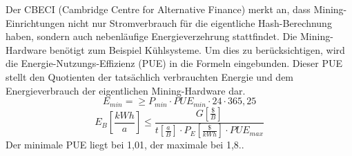 Der CBECI (Cambridge Centre for Alternative Finance) merkt an, dass Mining-Einrichtungen nicht nur Stromverbrauch für die eigentliche Hash-Berechnung haben, sondern auch nebenläufige Energieverzehrung stattfindet. Die Mining-Hardware benötigt zum Beispiel Kühlsysteme. Um dies zu berücksichtigen, wird die Energie-Nutzungs-Effizienz (PUE) in die Formeln eingebunden. Dieser PUE stellt den Quotienten der tatsächlich verbrauchten Energie und dem Energieverbrauch der eigentlichen Mining-Hardware dar.
\[E_{min}=\geq P_{min}\cdot PUE_{min}\cdot 24\cdot 365,25\]
\[E_B\left[\frac{kWh}{a}\right]\leq\frac{G\left[\frac{\$}{B}\right]}{t \left[\frac{a}{B}\right]\cdot P_E\left[\frac{\$}{kWh}\right]\cdot PUE_{max}}\]
Der minimale PUE liegt bei 1,01, der maximale bei 1,8..